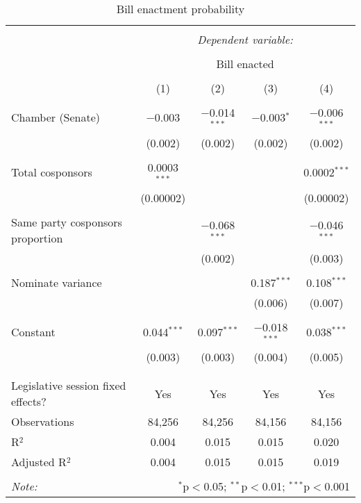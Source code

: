 \documentclass{article}
\begin{document}
  \begin{table}[!htbp] \centering 
    \caption{Bill enactment probability} 
    \label{tab:enactment_simple} 
  \begin{tabular}{@{\extracolsep{5pt}}lcccc} 
  \\[-1.8ex]\hline 
  \hline \\[-1.8ex] 
   & \multicolumn{4}{c}{\textit{Dependent variable:}} \\ 
  \cline{2-5} 
  \\[-1.8ex] & \multicolumn{4}{c}{Bill enacted} \\ 
  \\[-1.8ex] & (1) & (2) & (3) & (4)\\ 
  \hline \\[-1.8ex] 
   Chamber (Senate) & $-$0.003 & $-$0.014$^{***}$ & $-$0.003$^{*}$ & $-$0.006$^{***}$ \\ 
    & (0.002) & (0.002) & (0.002) & (0.002) \\ 
    & & & & \\ 
   Total cosponsors & 0.0003$^{***}$ &  &  & 0.0002$^{***}$ \\ 
    & (0.00002) &  &  & (0.00002) \\ 
    & & & & \\ 
   Same party cosponsors proportion &  & $-$0.068$^{***}$ &  & $-$0.046$^{***}$ \\ 
    &  & (0.002) &  & (0.003) \\ 
    & & & & \\ 
   Nominate variance &  &  & 0.187$^{***}$ & 0.108$^{***}$ \\ 
    &  &  & (0.006) & (0.007) \\ 
    & & & & \\ 
   Constant & 0.044$^{***}$ & 0.097$^{***}$ & $-$0.018$^{***}$ & 0.038$^{***}$ \\ 
    & (0.003) & (0.003) & (0.004) & (0.005) \\ 
    & & & & \\ 
  \hline \\[-1.8ex] 
  Legislative session fixed effects? & Yes & Yes & Yes & Yes \\ 
  Observations & 84,256 & 84,256 & 84,156 & 84,156 \\ 
  R$^{2}$ & 0.004 & 0.015 & 0.015 & 0.020 \\ 
  Adjusted R$^{2}$ & 0.004 & 0.015 & 0.015 & 0.019 \\ 
  \hline 
  \hline \\[-1.8ex] 
  \textit{Note:}  & \multicolumn{4}{r}{$^{*}$p$<$0.05; $^{**}$p$<$0.01; $^{***}$p$<$0.001} \\ 
  \end{tabular} 
  \end{table} 
\end{document}

